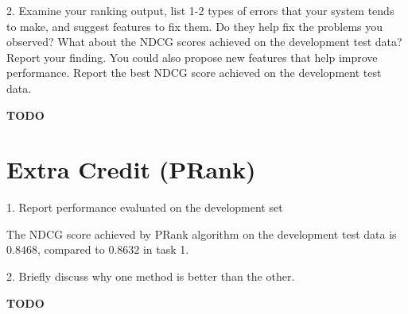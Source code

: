 2. Examine your ranking output, list 1-2 types of errors that your system tends
to make, and suggest features to fix them. Do they help fix the problems you
observed? What about the NDCG scores achieved on the development test data?
Report your finding. You could also propose new features that help improve performance.
Report the best NDCG score achieved on the development test data.

\textbf{TODO}


\section{Extra Credit (PRank)}

1. Report performance evaluated on the development set

The NDCG score achieved by PRank algorithm on the development test data is $0.8468$, compared to $0.8632$ in task 1.

2. Briefly discuss why one method is better than the other.

\textbf{TODO}


